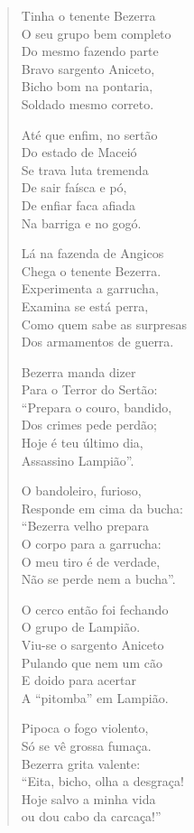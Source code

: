\begin{verse}
Tinha o tenente Bezerra\\
O seu grupo bem completo\\
Do mesmo fazendo parte\\
Bravo sargento Aniceto,\\
Bicho bom na pontaria,\\
Soldado mesmo correto.
\pagebreak

Até que enfim, no sertão\\
Do estado de Maceió\\
Se trava luta tremenda\\
De sair faísca e pó,\\
De enfiar faca afiada\\
Na barriga e no gogó.

Lá na fazenda de Angicos\\
Chega o tenente Bezerra.\\
Experimenta a garrucha,\\
Examina se está perra,\\
Como quem sabe as surpresas\\
Dos armamentos de guerra.

Bezerra manda dizer\\
Para o Terror do Sertão:\\
“Prepara o couro, bandido,\\
Dos crimes pede perdão;\\
Hoje é teu último dia,\\
Assassino Lampião”.

O bandoleiro, furioso,\\
Responde em cima da bucha:\\
“Bezerra velho prepara\\
O corpo para a garrucha:\\
O meu tiro é de verdade,\\
Não se perde nem a bucha”.
\pagebreak

O cerco então foi fechando\\
O grupo de Lampião.\\
Viu-se o sargento Aniceto\\
Pulando que nem um cão\\
E doido para acertar\\
A “pitomba” em Lampião.

Pipoca o fogo violento,\\
Só se vê grossa fumaça.\\
Bezerra grita valente:\\
“Eita, bicho, olha a desgraça!\\
Hoje salvo a minha vida\\
ou dou cabo da carcaça!”


\end{verse}
